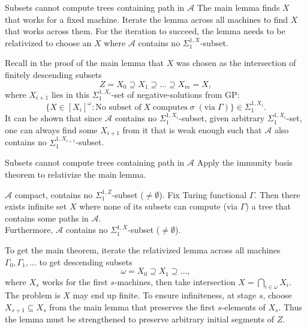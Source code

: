 \begin{frame}{Subsets cannot compute trees containing path in $\mathcal{A}$}
  The main lemma finds $X$ that works for a fixed
  machine. Iterate the lemma across all machines to find $X$ that
  works across them. For the iteration to succeed, the lemma needs
  to be relativized to choose an $X$ where $\mathcal{A}$ contains no
  $\Sigma_1^{1,X}$-subset.

  \vspace{0.5em}
  Recall in the proof of the main lemma that $X$ was
  chosen as the intersection of finitely descending subsets
  \[Z=X_0 \supseteq X_1 \supseteq \ldots\supseteq X_m=X,\]
  where $X_{i+1}$ lies in this $\Sigma_1^{1,X_i}$-set of negative-solutions
  from GP:
  \[\{X\in[X_i]^\omega: \text{No subset of}\; X\; \text{computes}\;
  \sigma\; (\text{via}\; \Gamma)\} \in\Sigma_1^{1,X_i}.\]
  It can be shown that since $\mathcal{A}$ contains no
  $\Sigma_1^{1,X_i}$-subset, given arbitrary $\Sigma_1^{1,X_i}$-set, one
  can always find some $X_{i+1}$ from it that is weak enough such that
  $\mathcal{A}$ also contains no $\Sigma_1^{1,X_{i+1}}$-subset.
\end{frame}

\begin{frame}{Subsets cannot compute trees containing path in $\mathcal{A}$}
  Apply the immunity basis theorem to relativize the main lemma.
  \begin{main-lemma*}[Relativized]
    $\mathcal{A}$ compact, contains no $\Sigma_1^{1,Z}$-subset
    ($\neq\emptyset$). Fix Turing functional $\Gamma$. Then there exists
    infinite set $X$ where none of its subsets can compute (via $\Gamma$) a
    tree that contains some paths in $\mathcal{A}$.\\
    \vspace{0.5em}
    Furthermore, $\mathcal{A}$ contains no $\Sigma_1^{1,X}$-subset
    ($\neq\emptyset$).
  \end{main-lemma*}

  To get the main theorem, iterate the relativized lemma across all
  machines $\Gamma_0,\Gamma_1,\ldots$ to get descending subsets
  \[\omega=X_0\supseteq X_1\supseteq\ldots,\]
  where $X_s$ works for the first $s$-machines, then take intersection
  $X=\bigcap_{i\in\omega} X_i$. The problem is $X$ may end up finite. To
  ensure infiniteness, at stage $s$, choose $X_{s+1}\subseteq X_s$ from the
  main lemma that preserves the first $s$-elements of $X_s$. Thus the lemma
  must be strengthened to preserve arbitrary initial segments of $Z$.
\end{frame}

